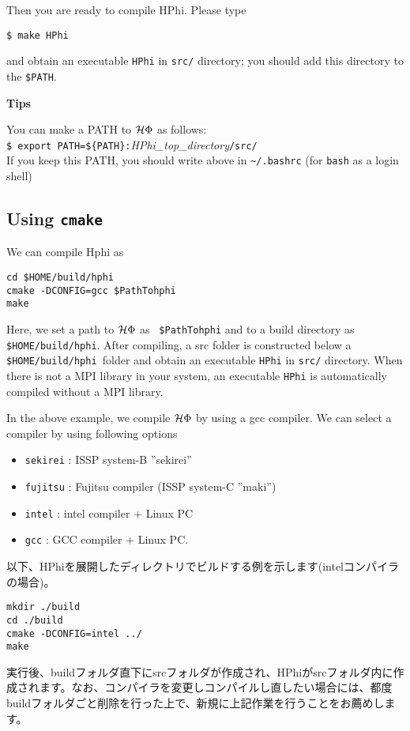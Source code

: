 Then you are ready to compile HPhi.
Please type
\begin{verbatim}
$ make HPhi
\end{verbatim}
and obtain an executable \verb|HPhi| in \verb|src/| directory;
you should add this directory to the \verb|$PATH|.



\begin{screen}
\Large 
{\bf Tips}
\normalsize

You can make a PATH to $\mathcal{H} \Phi$ as follows:
\\
\verb|$ export PATH=${PATH}:|\textit{HPhi\_top\_directory}\verb|/src/|
\\
If you keep this PATH, you should write above in \verb|~/.bashrc|
(for \verb|bash| as a login shell)

\end{screen}


\subsection{Using \texttt{cmake}}
We can compile Hphi as
\begin{verbatim}
cd $HOME/build/hphi
cmake -DCONFIG=gcc $PathTohphi
make
\end{verbatim}
Here, we set a path to $\mathcal{H} \Phi$ as \verb| $PathTohphi| and to a build directory as \verb| $HOME/build/hphi|. After compiling, a src folder is constructed below a \verb| $HOME/build/hphi |folder and obtain an executable \verb|HPhi| in \verb|src/| directory. When there is not a MPI library in your system, an executable \verb|HPhi| is automatically compiled without a MPI library.

In the above example, we compile $\mathcal{H} \Phi$ by using a gcc compiler. We can select a compiler by using following options
\begin{itemize}
\item \verb|sekirei| : ISSP system-B ''sekirei''
\item \verb|fujitsu| : Fujitsu compiler (ISSP system-C ''maki'')
\item \verb|intel| : intel compiler + Linux PC
\item \verb|gcc| : GCC compiler + Linux PC.
\end{itemize}
以下、HPhiを展開したディレクトリでビルドする例を示します(intelコンパイラの場合)。\\
\begin{minipage}{16cm}
\begin{screen}
\begin{verbatim}
mkdir ./build
cd ./build
cmake -DCONFIG=intel ../
make
\end{verbatim}
\end{screen}
\end{minipage}
実行後、buildフォルダ直下にsrcフォルダが作成され、HPhiがsrcフォルダ内に作成されます。なお、コンパイラを変更しコンパイルし直したい場合には、都度buildフォルダごと削除を行った上で、新規に上記作業を行うことをお薦めします。


